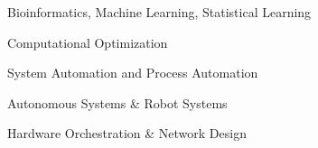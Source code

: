 \item Bioinformatics, Machine Learning, Statistical Learning
\item Computational Optimization
\item System Automation and Process Automation
\item Autonomous Systems \& Robot Systems
\item Hardware Orchestration \& Network Design
